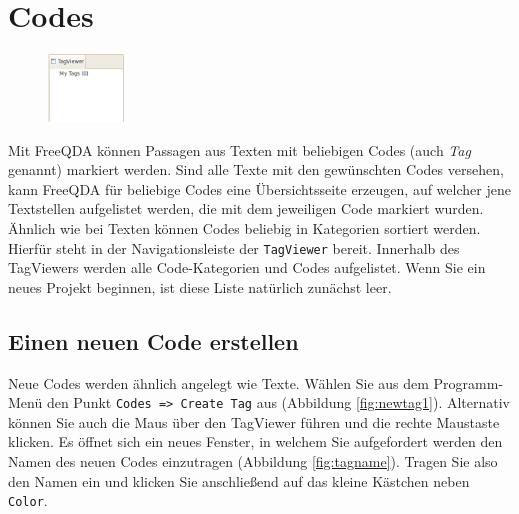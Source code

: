 \chapter{Codes}
\begin{figure}
 \vspace{-28pt}
 \begin{center}
    \includegraphics[width=0.18\textwidth]{img/codebrowser}
  \end{center}
  \vspace{12pt}
\end{figure}
Mit FreeQDA können Passagen aus Texten mit beliebigen Codes (auch \textit{Tag} genannt) markiert werden. Sind alle Texte mit den %
gewünschten Codes versehen, kann FreeQDA für beliebige Codes eine Übersichtsseite erzeugen, auf welcher jene Textstellen aufgelistet werden, die %
mit dem jeweiligen Code markiert wurden. 
Ähnlich wie bei Texten können Codes beliebig in Kategorien sortiert werden. Hierfür steht in der Navigationsleiste der \texttt{TagViewer} %
bereit. Innerhalb des TagViewers werden alle Code-Kategorien und Codes aufgelistet. Wenn Sie ein neues Projekt beginnen, ist diese Liste %
natürlich zunächst leer. 


\section{Einen neuen Code erstellen}
Neue Codes werden ähnlich angelegt wie Texte. Wählen Sie aus dem Programm-Menü den Punkt \texttt{Codes => Create Tag} aus (Abbildung \ref{fig:newtag1}). %
Alternativ können Sie auch %
die Maus über den TagViewer führen und die rechte Maustaste klicken. Es öffnet sich ein neues Fenster, in welchem Sie aufgefordert werden den %
Namen des neuen Codes einzutragen (Abbildung \ref{fig:tagname}). Tragen Sie also den Namen ein und klicken Sie anschließend auf das kleine %
Kästchen neben \texttt{Color}.

